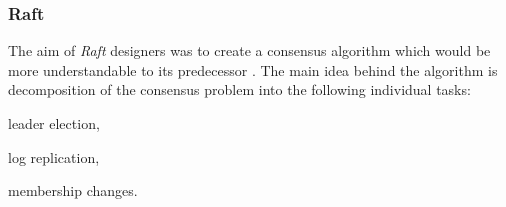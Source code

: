 










\subsubsection{Raft}
The aim of \emph{Raft} designers was to create a consensus algorithm which would be more understandable to its predecessor \cite{ongaro2014search}. 
The main idea behind the algorithm is decomposition of the consensus problem into the following individual tasks:
\begin{enumerate*}[label=\alph*)]
\item leader election,
\item log replication,
\item membership changes.
\end{enumerate*} 
 
